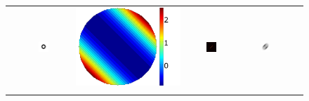 \begin{figure}[h]
\begin{tabular}{@{}r@{ } c@{ } c@{ } c@{ } c@{ } c }
	\begin{sideways} \parbox[b]{25mm} {} \end{sideways} &
	\includegraphics[width= 0.22\textwidth]{__Images/05/synthetic_sims/O_20-200@4x.png} &
	\includegraphics[height=0.22\textwidth]{__Images/05/synthetic_sims/Wavefront_0D,-4,7@135.png} &
	\includegraphics[width= 0.22\textwidth]{__Images/05/synthetic_sims/PSF_0D,-4,7@135.png} &
	\includegraphics[width= 0.22\textwidth]{__Images/05/synthetic_sims/O_20-200_f50_simulated(0D,-4,7@135).png}			\\ \\


\end{tabular}
\end{figure}
